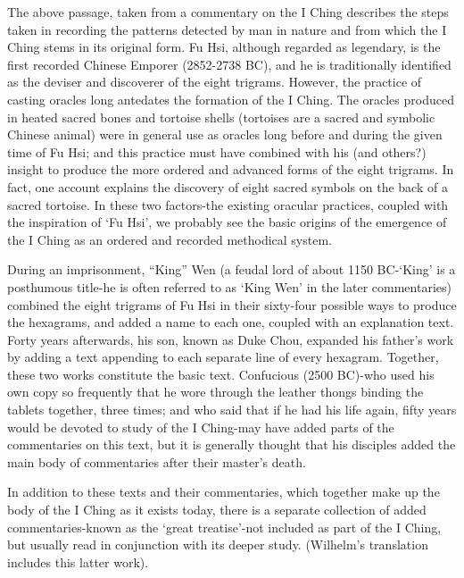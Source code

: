 \documentclass[11pt]{book}
\begin{document}
The above passage, taken from a commentary on the I Ching describes the steps taken in recording the patterns detected by man in nature and from which the I Ching stems in its original form. Fu Hsi, although regarded as legendary, is the first recorded Chinese Emporer (2852-2738 BC), and he is traditionally identified as the deviser and discoverer of the eight trigrams. However, the practice of casting oracles long antedates the formation of the I Ching. The oracles produced in heated sacred bones and tortoise shells (tortoises are a sacred and symbolic Chinese animal) were in general use as oracles long before and during the given time of Fu Hsi; and this practice must have combined with his (and others?) insight to produce the more ordered and advanced forms of the eight trigrams. In fact, one account explains the discovery of eight sacred symbols on the back of a sacred tortoise. In these two factors-the existing oracular practices, coupled with the inspiration of `Fu Hsi', we probably see the basic origins of the emergence of the I Ching as an ordered and recorded methodical system.

During an imprisonment, ``King'' Wen (a feudal lord of about 1150 BC-`King' is a posthumous title-he is often referred to as `King Wen' in the later commentaries) combined the eight trigrams of Fu Hsi in their sixty-four possible ways to produce the hexagrams, and added a name to each one, coupled with an explanation text. Forty years afterwards, his son, known as Duke Chou, expanded his father's work by adding a text appending to each separate line of every hexagram. Together, these two works constitute the basic text. Confucious (2500 BC)-who used his own copy so frequently that he wore through the leather thongs binding the tablets together, three times; and who said that if he had his life again, fifty years would be devoted to study of the I Ching-may have added parts of the commentaries on this text, but it is generally thought that his disciples added the main body of commentaries after their master's death.

In addition to these texts and their commentaries, which together make up the body of the I Ching as it exists today, there is a separate collection of added commentaries-known as the `great treatise'-not included as part of the I Ching, but usually read in conjunction with its deeper study. (Wilhelm's translation includes this latter work).
\end{document}
